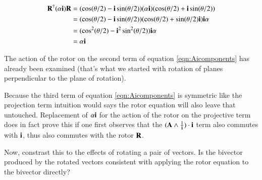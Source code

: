 \documentclass{article}      %
\begin{document}
\begin{align*}
\mathbf{R}^\dagger (\alpha \mathbf{i}) \mathbf{R}
&= (\cos(\theta/2) - \mathbf{i} \sin(\theta/2))(\alpha \mathbf{i}) (\cos(\theta/2) + \mathbf{i} \sin(\theta/2)) \\
&= (\cos(\theta/2) - \mathbf{i} \sin(\theta/2))(\cos(\theta/2) + \sin(\theta/2) \mathbf{i} ) \mathbf{i} \alpha \\
&= (\cos^2(\theta/2) - \mathbf{i}^2 \sin^2(\theta/2)) \mathbf{i} \alpha \\
&= \alpha \mathbf{i} \\
\end{align*}

The action of the rotor on the second term of equation \ref{eqn:Aicomponents} has already been examined (that's what we started with rotation of planes perpendicular to the plane of rotation).

Because the third term of equation \ref{eqn:Aicomponents} is symmetric like the projection term intuition would says the rotor equation will
also leave that untouched.  Replacement of $\alpha \mathbf{i}$ for the action of the rotor on the projective term does in fact prove this if
one first observes that the $(\mathbf{A} \wedge \frac{1}{\mathbf{i}}) \cdot \mathbf{i}$ term also commutes with $\mathbf{i}$, thus also commutes with the rotor $\mathbf{R}$.

Now, constrast this to the effects of rotating a pair of vectors.  Is the bivector produced by the rotated vectors consistent with applying
the rotor equation to the bivector directly?

\end{document}
